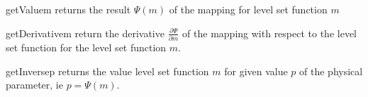 \begin{methoddesc}[Mapping]{getValue}{m}
returns the result $\Psi(m)$ of the mapping for level set function $m$
\end{methoddesc}

\begin{methoddesc}[Mapping]{getDerivative}{m}
return the derivative $\frac{\partial \Psi}{\partial m}$ of the mapping with respect to the level set function for 
the level set function $m$.
\end{methoddesc}  

\begin{methoddesc}[Mapping]{getInverse}{p}
returns the value level set function $m$ for given value $p$ of the physical parameter, ie $p=\Psi(m)$.  
\end{methoddesc}


